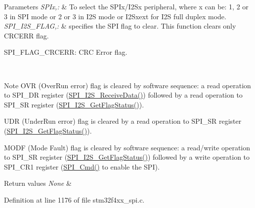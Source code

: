 \begin{DoxyParams}{Parameters}
{\em S\-P\-Ix,\-:} & To select the S\-P\-Ix/\-I2\-Sx peripheral, where x can be\-: 1, 2 or 3 in S\-P\-I mode or 2 or 3 in I2\-S mode or I2\-Sxext for I2\-S full duplex mode. \\
\hline
{\em S\-P\-I\-\_\-\-I2\-S\-\_\-\-F\-L\-A\-G,\-:} & specifies the S\-P\-I flag to clear. This function clears only C\-R\-C\-E\-R\-R flag. \begin{DoxyItemize}
\item S\-P\-I\-\_\-\-F\-L\-A\-G\-\_\-\-C\-R\-C\-E\-R\-R\-: C\-R\-C Error flag.\end{DoxyItemize}
\\
\hline
\end{DoxyParams}
\begin{DoxyNote}{Note}
O\-V\-R (Over\-Run error) flag is cleared by software sequence\-: a read operation to S\-P\-I\-\_\-\-D\-R register (\hyperlink{group___s_p_i_gab77de76547f3bff403236b263b070a30}{S\-P\-I\-\_\-\-I2\-S\-\_\-\-Receive\-Data()}) followed by a read operation to S\-P\-I\-\_\-\-S\-R register (\hyperlink{group___s_p_i_ga1bd785d129e09c5734a876c8f2767204}{S\-P\-I\-\_\-\-I2\-S\-\_\-\-Get\-Flag\-Status()}). 

U\-D\-R (Under\-Run error) flag is cleared by a read operation to S\-P\-I\-\_\-\-S\-R register (\hyperlink{group___s_p_i_ga1bd785d129e09c5734a876c8f2767204}{S\-P\-I\-\_\-\-I2\-S\-\_\-\-Get\-Flag\-Status()}). 

M\-O\-D\-F (Mode Fault) flag is cleared by software sequence\-: a read/write operation to S\-P\-I\-\_\-\-S\-R register (\hyperlink{group___s_p_i_ga1bd785d129e09c5734a876c8f2767204}{S\-P\-I\-\_\-\-I2\-S\-\_\-\-Get\-Flag\-Status()}) followed by a write operation to S\-P\-I\-\_\-\-C\-R1 register (\hyperlink{group___s_p_i_gaa31357879a65ee1ed7223f3b9114dcf3}{S\-P\-I\-\_\-\-Cmd()} to enable the S\-P\-I).
\end{DoxyNote}

\begin{DoxyRetVals}{Return values}
{\em None} & \\
\hline
\end{DoxyRetVals}


Definition at line 1176 of file stm32f4xx\-\_\-spi.\-c.

